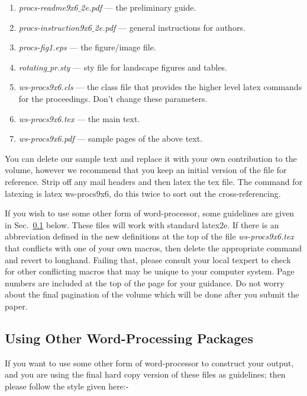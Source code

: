 \documentclass{ws-procs9x6}
\begin{document}
\begin{enumerate}
\item {\em procs-readme9x6$\_$2e.pdf} --- the preliminary guide.

\item {\em procs-instruction9x6$\_$2e.pdf} --- general instructions 
for authors.

\item{\em procs-fig1.eps} --- the figure/image file.

\item{\em rotating$\_$pr.sty} --- sty file for landscape figures and tables.

\item {\em ws-procs9x6.cls} --- the class file that provides the higher
level latex commands for the proceedings. Don't change these parameters.

\item {\em ws-procs9x6.tex} --- the main text. 

\item {\em ws-procs9x6.pdf} --- sample pages of the above text.
\end{enumerate}

You can delete our sample text and replace it with your own 
contribution to the volume, however we recommend that you keep an 
initial version of the file for reference.  Strip off any mail 
headers and then latex the tex file.  The command for latexing is 
{\sf latex ws-procs9x6}, do this twice to sort out 
the cross-referencing.

If you wish to use some other form of word-processor, some 
guidelines are given in Sec.~\ref{subsec:wpp} below.  These 
files will work with standard latex2e. If there is an
abbreviation defined in the new definitions at the top of the 
file {\em ws-procs9x6.tex} that conflicts with one of your own 
macros, then delete the appropriate command and revert to
longhand. Failing that, please consult your local texpert to
check for other conflicting macros that may be unique to your
computer system.  Page numbers are included at the top of the
page for your guidance. Do not worry about the final pagination
of the volume which will be done after you submit the paper.

\subsection{Using Other Word-Processing Packages}\label{subsec:wpp}
If you want to use some other form of word-processor to
construct your output, and you are using the final hard copy version
of these files as guidelines; then please follow the style given
here:- 
\end{document}
